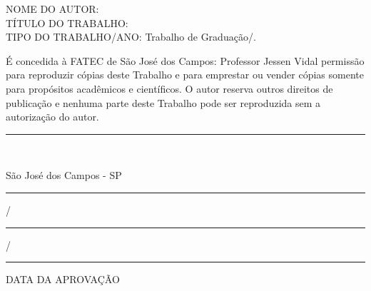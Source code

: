 \documentclass[
  12pt,
  oneside,
  a4paper,
  chapter=TITLE,
  sumario=tradicional,
  english,
  brazil
]{abntex2}
\begin{document}
\begin{fichacatalografica}
  \vspace{0.3cm}
  NOME DO AUTOR: \imprimirautor\\
  TÍTULO DO TRABALHO: \imprimirtitulo\\
  TIPO DO TRABALHO/ANO: Trabalho de Graduação/\imprimirdata.

  \vspace{0.3cm}
  É concedida à FATEC de São José dos Campos: Professor Jessen Vidal permissão para reproduzir
  cópias deste Trabalho e para emprestar ou vender cópias somente para propósitos acadêmicos e
  científicos. O autor reserva outros direitos de publicação e nenhuma parte deste Trabalho pode
  ser reproduzida sem a autorização do autor.

  \vspace{1.5cm}
  \rule{7cm}{0.4pt}\\
  \imprimirautor

  \vspace{0.5cm}
  São José dos Campos - SP
\end{fichacatalografica}

\begin{folhadeaprovacao}
  \begin{center}
    {\bfseries\MakeTextUppercase{\imprimirautor}\par}
    \vspace*{\fill}
    {\bfseries\large\MakeTextUppercase{\imprimirtitulo}\par}
    \vspace*{\fill}
    \hspace{.45\textwidth}
    \begin{minipage}{.5\textwidth}
      \SingleSpacing
      \imprimirpreambulo
    \end{minipage}%
    \vspace*{\fill}
  \end{center}

  \setlength{\ABNTEXsignwidth}{14cm}

  \vspace*{\fill}
  \begin{center}
    \rule{1.2cm}{0.4pt}/\rule{1.2cm}{0.4pt}/\rule{1.2cm}{0.4pt}\par
    \vspace{0.3cm}
    DATA DA APROVAÇÃO
  \end{center}
\end{folhadeaprovacao}
\end{document}
